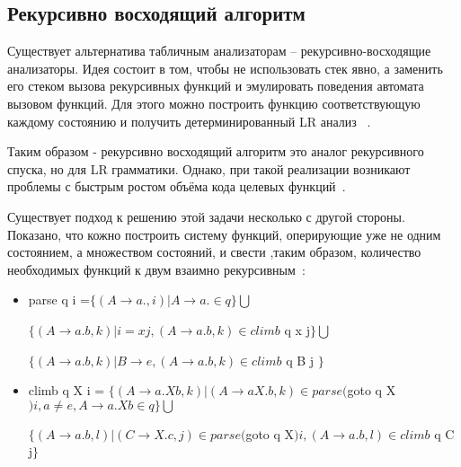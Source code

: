 \subsection{Рекурсивно восходящий алгоритм}


Существует альтернатива табличным анализаторам -- рекурсивно-восходящие  анализаторы. Идея состоит в том, чтобы не использовать стек явно, а заменить его стеком вызова рекурсивных функций и эмулировать поведения автомата вызовом функций. Для этого можно построить функцию соответствующую каждому состоянию и получить детерминированный LR анализ ~\cite{RECURSIVE-ASCENT PARSING}.  

Таким образом - рекурсивно восходящий алгоритм это аналог рекурсивного спуска, но для LR грамматики.  Однако, при такой реализации возникают проблемы с быстрым ростом объёма кода целевых функций~\cite{Jade}. 

Существует подход к решению этой задачи несколько с другой стороны. Показано, что кожно построить систему функций, оперирующие уже не одним состоянием, а множеством состояний, и свести ,таким образом, количество необходимых функций к двум взаимно рекурсивным~\cite{RecursiveAscentParsing}:  
\begin{itemize}
	\item parse  q i =$\{(A\stackrel{}{\rightarrow}a. , i) | A\stackrel{}{\rightarrow} a. \in q\}\bigcup$
  
  \hspace{1,9cm}       $\{(A\stackrel{}{\rightarrow}a.b , k) | i = xj ,(A\stackrel{}{\rightarrow}a.b, k) \in climb$ q x j$  \}
  \bigcup$
  
  \hspace{1,9cm}       $\{(A\stackrel{}{\rightarrow}a.b , k) | B\stackrel{}{\rightarrow}e , (A\stackrel{}{\rightarrow}a.b, k) \in climb$ q B j $\}$
  \item climb q X  i = $\{(A\stackrel{}{\rightarrow}a.Xb , k) | (A\stackrel{}{\rightarrow}aX.b, k)\in parse($goto q X$) i , a\neq e, A\stackrel{}{\rightarrow}a.Xb \in q\}\bigcup$
  
  \hspace{2,5cm}          $\{(A\stackrel{}{\rightarrow}a.b , l) | (C\stackrel{}{\rightarrow}X.c,j)\in parse($goto q X$) i, (A\stackrel{}{\rightarrow}a.b ,l)\in climb$ q C j$\} $
\end{itemize}
 

